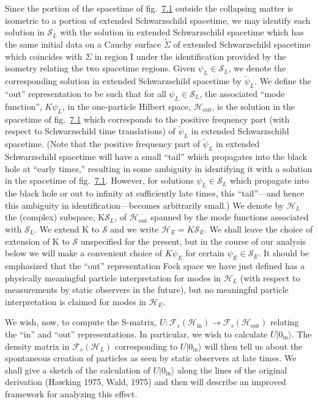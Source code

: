 \documentclass[11pt,a4paper]{article}
\begin{document}
Since the portion of the spacetime of fig.~\hyperref[fig:7.1]{7.1} outside the collapsing matter is isometric to a portion of extended Schwarzschild spacetime, we may identify each solution in \(\mathcal S_L\) with the solution in extended Schwarzschild spacetime which has the same initial data on a Cauchy surface \(\widetilde{\Sigma}\) of extended Schwarzschild spacetime which \hypertarget{source-167}{} coincides with \(\Sigma\) in region I under the identification provided by the isometry relating the two spacetime regions. Given \(\psi_L \in \mathcal S_L\), we denote the corresponding solution in extended Schwarzschild spacetime by \(\widetilde{\psi}_L\). We define the ``out'' representation to be such that for all \(\psi_L \in \mathcal S_L\), the associated ``mode function'', \(K\psi_L\), in the one-particle Hilbert space, \(\mathcal{H}_{\mathrm{out}}\), is the solution in the spacetime of fig.~\hyperref[fig:7.1]{7.1} which corresponds to the positive frequency part (with respect to Schwarzschild time translations) of \(\tilde\psi_L\) in extended Schwarzschild spacetime. (Note that the positive frequency part of \(\tilde{\psi}_L\) in extended Schwarzschild spacetime will have a small ``tail'' which propagates into the black hole at ``early times,'' resulting in some ambiguity in identifying it with a solution in the spacetime of fig.~\hyperref[fig:7.1]{7.1}. However, for solutions \(\psi_L\in\mathcal S_L\) which propagate into the black hole or out to infinity at sufficiently late times, this ``tail''---and hence this ambiguity in identification---becomes arbitrarily small.) We denote by \(\mathcal H_L\) the (complex) subspace, K\(\mathcal{S}_{L}\), of \(\mathcal{H}_{\mathrm{out}}\) spanned by the mode functions associated with \(\mathcal{S}_{L}\). We extend K to \(\mathcal{S}\) and we write \(\mathcal H_E=K\mathcal S_E\). We shall leave the choice of extension of K to \(\mathcal{S}\) unspecified for the present, but in the course of our analysis below we will make a convenient choice of \(K\psi_E\) for certain \(\psi_E \in \mathcal{S}_E\). It should be emphasized that the ``out'' representation Fock space we have just defined has a physically meaningful particle interpretation for modes in \(\mathcal H_L\) (with respect to measurements by static observers in the future), but no meaningful particle interpretation is claimed for modes in \(\mathcal{H}_{E}\).

We wish, now, to compute the S-matrix, \(U:\mathcal{F}_s(\mathcal{H}_{\mathrm{in}}) \to \mathcal{F}_s(\mathcal{H}_{\mathrm{out}})\) relating the ``in'' and ``out'' representations. In particular, we wish to calculate \(U\lvert 0_{\mathrm{in}}\rangle \). The density matrix in \(\mathcal{F}_s(\mathcal{H}_L)\) corresponding to \(U\lvert 0_{\mathrm{in}}\rangle \) will then tell us about the spontaneous creation of particles as seen by static observers at late times. We shall give a sketch of the calculation of \(U\lvert 0_{\mathrm{in}}\rangle \) along the lines of the original derivation (Hawking 1975, Wald, 1975) and then will describe an improved framework for analyzing this effect.
\end{document}

